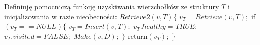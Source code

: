 \documentclass{pracamgr}
\begin{document}
    Definiuję pomocniczą funkcję uzyskiwania wierzchołków ze struktury $T$ i inicjalizowania w razie nieobecności:\newline\newline
    \hspace*{0pt}$Retrieve2(v,T)\{$\newline
    \hspace*{16pt}	$v_T=Retrieve(v,T);$\newline
    \hspace*{16pt}	if$(v_T==NULL)\{$\newline
    \hspace*{32pt}		$v_T=Insert(v,T);$\newline
    \hspace*{32pt}		$v_T.healthy=TRUE;$\newline
    \hspace*{32pt}		$v_T.visited=FALSE;$\newline
    \hspace*{32pt}		$Make(v,D);$\newline
    \hspace*{16pt}	$\}$\newline
    \hspace*{16pt}	return$(v_T);$\newline
    \hspace*{0pt}$\}$\newline
    
\end{document}
